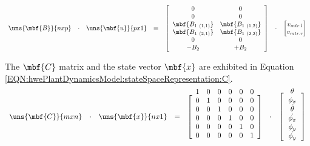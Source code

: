 \documentclass[crop=false,float=true,class=scrreprt]{standalone}
\begin{document}
\begin{equation}
\label{EQN:hwePlantDynamicsModel:stateSpaceRepresentation:B}
\begin{array}{ccccccc}
\uns{\mbf{B}}{n x p}
& \cdot &
\uns{\mbf{u}}{p x 1}
& = &
\begin{bmatrix}
\begin{array}{cccccc}
0 & 0 \\
0 & 0 \\
\mbf{B_{1\ (1,1)}} & \mbf{B_{1\ (1,2)}} \\
\mbf{B_{1\ (2,1)}} & \mbf{B_{1\ (2,2)}} \\
0 & 0 \\
-B_{2} & +B_{2} \\
\end{array}
\end{bmatrix}
& \cdot &
\begin{bmatrix}
v_{mtr.l} \\
v_{mtr.r} \\
\end{bmatrix}
\end{array}
\end{equation}

\vspace{-1em}




The $\mbf{C}$ matrix and the state vector $\mbf{x}$ are exhibited in Equation~%
\eqref{EQN:hwePlantDynamicsModel:stateSpaceRepresentation:C}.


\vspace{-1em}


\begin{equation}
\label{EQN:hwePlantDynamicsModel:stateSpaceRepresentation:C}
\begin{array}{ccccccccccccccc}
\uns{\mbf{C}}{m x n}
& \cdot &
\uns{\mbf{x}}{n x 1}
& = &
\begin{bmatrix}
\hphantom{v_{mtr.l}}\\[-2em]
\begin{array}{cccccc}
1 & 0 & 0 & 0 & 0 & 0 \\
0 & 1 & 0 & 0 & 0 & 0 \\
0 & 0 & 1 & 0 & 0 & 0 \\
0 & 0 & 0 & 1 & 0 & 0 \\
0 & 0 & 0 & 0 & 1 & 0 \\
0 & 0 & 0 & 0 & 0 & 1 \\
\end{array}
\end{bmatrix}
& \cdot &
\begin{bmatrix}
\hphantom{v_{mtr.l}}\\[-2em]
\theta         \\
\phi_{x}       \\
\dot{\theta}   \\
\dot{\phi_{x}} \\
\phi_{y}       \\
\dot{\phi_{y}} \\
\end{bmatrix}
\end{array}
\end{equation}
\end{document}
